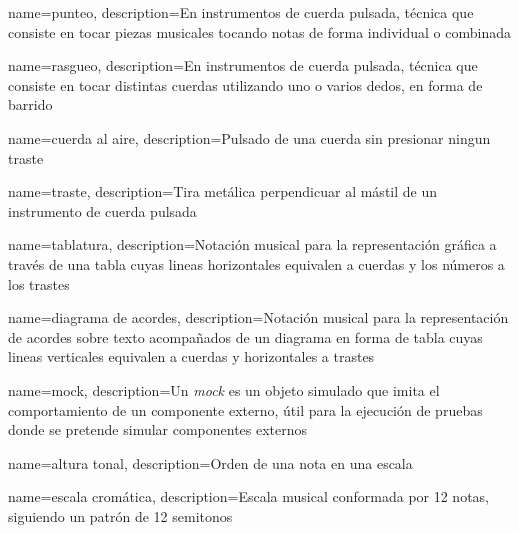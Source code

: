 {
    name=punteo,
    description={En instrumentos de cuerda pulsada, técnica que consiste en tocar piezas musicales tocando notas de forma individual o combinada}
}

{
    name=rasgueo,
    description={En instrumentos de cuerda pulsada, técnica que consiste en tocar distintas cuerdas utilizando uno o varios dedos, en forma de barrido}
}

{
    name=cuerda al aire,
    description={Pulsado de una cuerda sin presionar ningun traste}
}

{
    name=traste,
    description={Tira metálica perpendicuar al mástil de un instrumento de cuerda pulsada}
}

{
    name=tablatura,
    description={Notación musical para la representación gráfica a través de una tabla cuyas lineas horizontales equivalen a cuerdas y los números a los trastes}
}

{
    name=diagrama de acordes,
    description={Notación musical para la representación de acordes sobre texto acompañados de un diagrama en forma de tabla cuyas lineas verticales equivalen a cuerdas y horizontales a trastes}
}


{
    name=mock,
    description={Un \textit{mock} es un objeto simulado que imita el comportamiento de un componente externo, útil para la ejecución de pruebas donde se pretende simular componentes externos}
}

{
    name=altura tonal,
    description={Orden de una nota en una escala}
}

{
    name=escala cromática,
    description={Escala musical conformada por 12 notas, siguiendo un patrón de 12 semitonos}
}